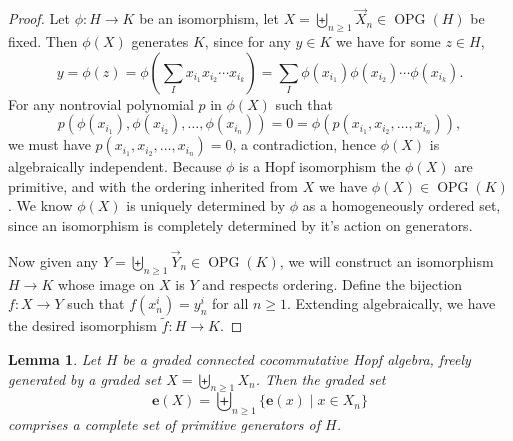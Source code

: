 \documentclass[11pt]{amsart}
\newtheorem{lemma}[theorem]{Lemma}
\theoremstyle{definition}
\numberwithin{equation}{section}
\DeclareMathOperator{\OPG}{OPG}
\begin{document}
\begin{proof}
	Let $\phi : H \to K$ be an isomorphism, let $X = \biguplus_{n \geq 1} \vec{X}_n \in \OPG(H)$ be fixed. Then $\phi(X)$ generates $K$, since for any $y \in K$ we have for some $z \in H$,
    \[
    y = \phi(z) = \phi(\sum_{I} x_{i_1}x_{i_2}\cdots x_{i_k}) = \sum_{I} \phi(x_{i_1})\phi(x_{i_2})\cdots \phi(x_{i_k}).
    \]
    For any nontrovial polynomial $p$ in $\phi(X)$ such that 
    \[
    p(\phi(x_{i_1}),\phi(x_{i_2}),\ldots ,\phi(x_{i_n})) = 0 = \phi(p(x_{i_1},x_{i_2},\ldots ,x_{i_n})),
    \]
    we must have $p(x_{i_1},x_{i_2},\ldots ,x_{i_n}) = 0$, a contradiction, hence $\phi(X)$ is algebraically independent. Because $\phi$ is a Hopf isomorphism the $\phi(X)$ are primitive, and with the ordering inherited from $X$ we have $\phi(X) \in \OPG(K)$. We know $\phi(X)$ is uniquely determined by $\phi$ as a homogeneously ordered set, since an isomorphism is completely determined by it's action on generators.

    Now given any $Y = \biguplus_{n \geq 1} \vec{Y}_n \in \OPG(K)$, we will construct an isomorphism $H \to K$ whose image on $X$ is $Y$ and respects ordering. Define the bijection $f:X \to Y$ such that $f(x_n^i) = y_n^i$ for all $n \geq 1$. Extending algebraically, we have the desired isomorphism $\tilde{f}:H \to K$.
\end{proof}

\begin{lemma}
    \label{lemma:primitive generators}
        Let $H$ be a graded connected cocommutative Hopf algebra, freely generated by a graded set $X=\biguplus_{n \geq 1}X_n$.  Then the graded set
        \[
        \mathbf{e}(X) = \biguplus_{n \ge 1} \{\mathbf{e}(x) \;|\; x \in X_{n}\}
        \]
        comprises a complete set of primitive generators of $H$.
\end{lemma}
\end{document}
